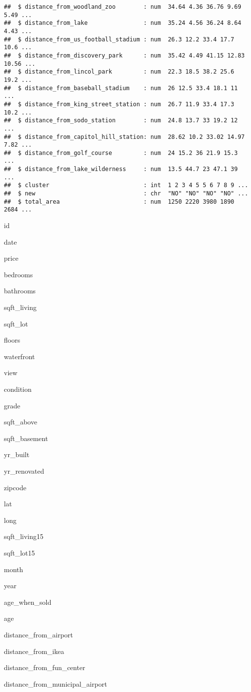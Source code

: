 \documentclass[]{article}
\begin{document}
\begin{verbatim}
##  $ distance_from_woodland_zoo        : num  34.64 4.36 36.76 9.69 5.49 ...
##  $ distance_from_lake                : num  35.24 4.56 36.24 8.64 4.43 ...
##  $ distance_from_us_football_stadium : num  26.3 12.2 33.4 17.7 10.6 ...
##  $ distance_from_discovery_park      : num  35.42 4.49 41.15 12.83 10.56 ...
##  $ distance_from_lincol_park         : num  22.3 18.5 38.2 25.6 19.2 ...
##  $ distance_from_baseball_stadium    : num  26 12.5 33.4 18.1 11 ...
##  $ distance_from_king_street_station : num  26.7 11.9 33.4 17.3 10.2 ...
##  $ distance_from_sodo_station        : num  24.8 13.7 33 19.2 12 ...
##  $ distance_from_capitol_hill_station: num  28.62 10.2 33.02 14.97 7.82 ...
##  $ distance_from_golf_course         : num  24 15.2 36 21.9 15.3 ...
##  $ distance_from_lake_wilderness     : num  13.5 44.7 23 47.1 39 ...
##  $ cluster                           : int  1 2 3 4 5 5 6 7 8 9 ...
##  $ new                               : chr  "NO" "NO" "NO" "NO" ...
##  $ total_area                        : num  1250 2220 3980 1890 2684 ...
\end{verbatim}

id

date

price

bedrooms

bathrooms

sqft\_living

sqft\_lot

floors

waterfront

view

condition

grade

sqft\_above

sqft\_basement

yr\_built

yr\_renovated

zipcode

lat

long

sqft\_living15

sqft\_lot15

month

year

age\_when\_sold

age

distance\_from\_airport

distance\_from\_ikea

distance\_from\_fun\_center

distance\_from\_municipal\_airport
\end{document}
